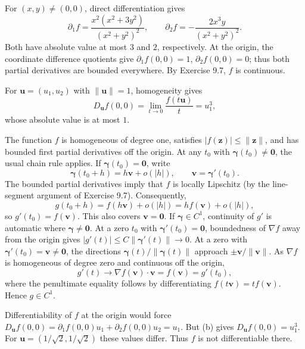 \documentclass[11pt,oneside]{article}
\begin{document}
\begin{solution}
\begin{exercisesubparts}
\item For $(x,y)\ne(0,0)$, direct differentiation gives
\[
 \partial_1 f=\frac{x^2(x^2+3y^2)}{(x^2+y^2)^2},\qquad
 \partial_2 f=-\frac{2x^3y}{(x^2+y^2)^2}.
\]
Both have absolute value at most $3$ and $2$, respectively. At the origin, the coordinate difference quotients give $\partial_1f(0,0)=1$, $\partial_2f(0,0)=0$; thus both partial derivatives are bounded everywhere. By Exercise 9.7, $f$ is continuous.
\item For $\mathbf u=(u_1,u_2)$ with $\|\mathbf u\|=1$, homogeneity gives
\[
 D_{\mathbf u}f(0,0)=\lim_{t\to0}\frac{f(t\mathbf u)}t=u_1^3,
\]
whose absolute value is at most $1$.
\item The function $f$ is homogeneous of degree one, satisfies $|f(\mathbf z)|\le\|\mathbf z\|$, and has bounded first partial derivatives off the origin. At any $t_0$ with $\boldsymbol\gamma(t_0)\ne\mathbf0$, the usual chain rule applies. If $\boldsymbol\gamma(t_0)=\mathbf0$, write
\[
 \boldsymbol\gamma(t_0+h)=h\mathbf v+o(|h|),
 \qquad\mathbf v=\boldsymbol\gamma'(t_0).
\]
The bounded partial derivatives imply that $f$ is locally Lipschitz (by the line-segment argument of Exercise 9.7). Consequently,
\[
 g(t_0+h)=f(h\mathbf v)+o(|h|)=h f(\mathbf v)+o(|h|),
\]
so $g'(t_0)=f(\mathbf v)$. This also covers $\mathbf v=\mathbf0$.
If $\boldsymbol\gamma\in C^1$, continuity of $g'$ is automatic where $\boldsymbol\gamma\ne\mathbf0$. At a zero $t_0$ with $\boldsymbol\gamma'(t_0)=\mathbf0$, boundedness of $\nabla f$ away from the origin gives $|g'(t)|\le C\|\boldsymbol\gamma'(t)\|\to0$. At a zero with $\boldsymbol\gamma'(t_0)=\mathbf v\ne\mathbf0$, the directions $\boldsymbol\gamma(t)/\|\boldsymbol\gamma(t)\|$ approach $\pm\mathbf v/\|\mathbf v\|$. As $\nabla f$ is homogeneous of degree zero and continuous off the origin,
\[
 g'(t)\to\nabla f(\mathbf v)\cdot\mathbf v=f(\mathbf v)=g'(t_0),
\]
where the penultimate equality follows by differentiating $f(t\mathbf v)=tf(\mathbf v)$. Hence $g\in C^1$.
\item Differentiability of $f$ at the origin would force
$D_{\mathbf u}f(0,0)=\partial_1f(0,0)u_1+\partial_2f(0,0)u_2=u_1$.
But (b) gives $D_{\mathbf u}f(0,0)=u_1^3$. For $\mathbf u=(1/\sqrt2,1/\sqrt2)$ these values differ. Thus $f$ is not differentiable there.
\end{exercisesubparts}
\end{solution}
\end{document}
